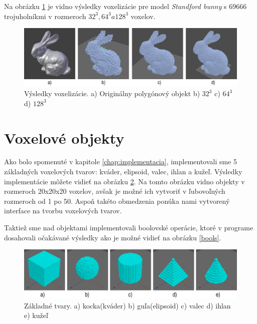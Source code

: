 Na obrázku \ref{bunny} je vidno výsledky voxelizácie pre model \textit{Standford bunny} s 69666 trojuholníkmi v rozmeroch $32^3, 64^3 a 128^3$ voxelov.

\begin{figure}[ht!]
	\centering
	\includegraphics[width=1.0\textwidth]{bunny.jpg}
	\caption[Výsledky voxelizácie]{Výsledky voxelizácie. a) Originálny polygónový objekt b) $32^3$ c) $64^3$ d) $128^3$}
	\label{bunny}
\end{figure}

\section{Voxelové objekty}
Ako bolo spomenuté v kapitole \ref{chap:implementacia}, implementovali sme 5 základných voxelových tvarov: kváder, elipsoid, valec, ihlan a kužeľ. Výsledky implementácie môžete vidieť na obrázku \ref{shapes}. Na tomto obrázku vidno objekty v rozmeroch 20x20x20 voxelov, avšak je možné ich vytvoriť v ľubovoľných rozmeroch od 1 po 50. Aspoň takéto obmedzenia ponúka nami vytvorený interface na tvorbu voxelových tvarov.


Taktiež sme nad objektami implementovali boolovské operácie, ktoré v programe dosahovali očakávané výsledky ako je možné vidieť na obrázku \ref{bools}.


\begin{figure}[!h]
	\centering
	\includegraphics[width=1.0\textwidth]{shapes.jpg}
	\caption[Základné objekty]{Základné tvary. a) kocka(kváder) b) guľa(elipsoid) c) valec d) ihlan e) kužeľ }
	\label{shapes}
\end{figure}

